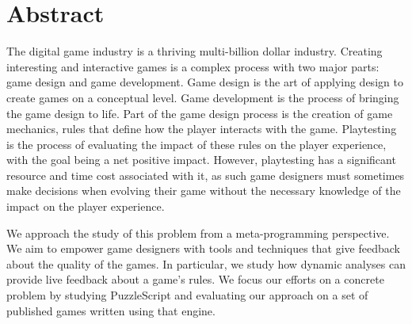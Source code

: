 \chapter*{Abstract}

The digital game industry is a thriving multi-billion dollar industry. Creating interesting and interactive games is a complex process with two major parts: game design and game development. Game design is the art of applying design to create games on a conceptual level. Game development is the process of bringing the game design to life. Part of the game design process is the creation of game mechanics, rules that define how the player interacts with the game. Playtesting is the process of evaluating the impact of these rules on the player experience, with the goal being a net positive impact. However, playtesting has a significant resource and time cost associated with it, as such game designers must sometimes make decisions when evolving their game without the necessary knowledge of the impact on the player experience. 






We approach the study of this problem from a meta-programming perspective. We aim to empower game designers with tools and techniques that give feedback about the quality of the games. In particular, we study how dynamic analyses can provide live feedback about a game's rules. We focus our efforts on a concrete problem by studying PuzzleScript and evaluating our approach on a set of published games written using that engine.


